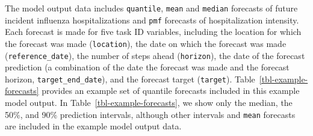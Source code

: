 \documentclass[
  article,
  shortnames,
  notitle]{jss}
\begin{document}
The model output data includes \texttt{quantile}, \texttt{mean} and
\texttt{median} forecasts of future incident influenza hospitalizations
and \texttt{pmf} forecasts of hospitalization intensity. Each forecast
is made for five task ID variables, including the location for which the
forecast was made (\texttt{location}), the date on which the forecast
was made (\texttt{reference\_date}), the number of steps ahead
(\texttt{horizon}), the date of the forecast prediction (a combination
of the date the forecast was made and the forecast horizon,
\texttt{target\_end\_date}), and the forecast target (\texttt{target}).
Table~\ref{tbl-example-forecasts} provides an example set of quantile
forecasts included in this example model output. In
Table~\ref{tbl-example-forecasts}, we show only the median, the 50\%,
and 90\% prediction intervals, although other intervals and
\texttt{mean} forecasts are included in the example model output data.
\end{document}
